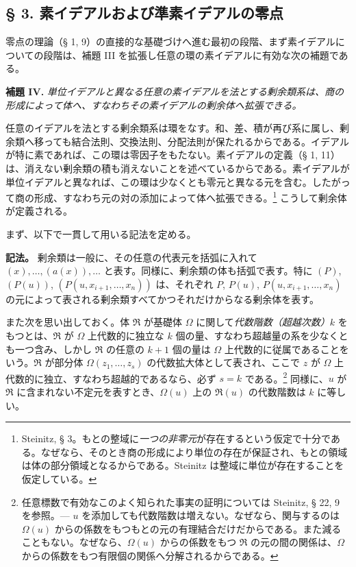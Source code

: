 \documentclass[11pt]{article}
\providecommand{\mR}{\mathfrak{R}}
\providecommand{\mR}{\mathfrak{R}}
\begin{document}
\subsection*{§ 3. 素イデアルおよび準素イデアルの零点}

零点の理論（§ 1, 9）の直接的な基礎づけへ進む最初の段階、まず素イデアルについての段階は、補題 III を拡張し任意の環の素イデアルに有効な次の補題である。

\textbf{補題 IV.} \emph{単位イデアルと異なる任意の素イデアルを法とする剰余類系は、商の形成によって体へ、すなわちその素イデアルの剰余体へ拡張できる。}

任意のイデアルを法とする剰余類系は環をなす。和、差、積が再び系に属し、剰余類へ移っても結合法則、交換法則、分配法則が保たれるからである。イデアルが特に素であれば、この環は零因子をもたない。素イデアルの定義（§ 1, 11）は、消えない剰余類の積も消えないことを述べているからである。素イデアルが単位イデアルと異なれば、この環は少なくとも零元と異なる元を含む。したがって商の形成、すなわち元の対の添加によって体へ拡張できる。\footnote{Steinitz, § 3。もとの整域に\emph{一つの非零元}が存在するという仮定で十分である。なぜなら、そのとき商の形成により単位の存在が保証され、もとの領域は体の部分領域となるからである。Steinitz は整域に単位が存在することを仮定している。} こうして剰余体が定義される。

まず、以下で一貫して用いる記法を定める。

\textbf{記法。} 剰余類は一般に、その任意の代表元を括弧に入れて $(x),\ldots,(a(x)),\ldots$ と表す。同様に、剰余類の体も括弧で表す。特に $(P)$, $(P(u))$, $(P(u,x_{i+1},\ldots,x_n))$ は、それぞれ $P$, $P(u)$, $P(u,x_{i+1},\ldots,x_n)$ の元によって表される剰余類すべてかつそれだけからなる剰余体を表す。

また次を思い出しておく。体 $\mR$ が基礎体 $\Omega$ に関して\emph{代数階数（超越次数）}$k$ をもつとは、$\mR$ が $\Omega$ 上代数的に独立な $k$ 個の量、すなわち超越量の系を少なくとも一つ含み、しかし $\mR$ の任意の $k+1$ 個の量は $\Omega$ 上代数的に従属であることをいう。$\mR$ が部分体 $\Omega(z_1,\ldots,z_s)$ の代数拡大体として表され、ここで $z$ が $\Omega$ 上代数的に独立、すなわち超越的であるなら、必ず $s=k$ である。\footnote{任意標数で有効なこのよく知られた事実の証明については Steinitz, § 22, 9 を参照。--- $u$ を添加しても代数階数は増えない。なぜなら、関与するのは $\Omega(u)$ からの係数をもつもとの元の有理結合だけだからである。また減ることもない。なぜなら、$\Omega(u)$ からの係数をもつ $\mR$ の元の間の関係は、$\Omega$ からの係数をもつ有限個の関係へ分解されるからである。} 同様に、$u$ が $\mR$ に含まれない不定元を表すとき、$\Omega(u)$ 上の $\mR(u)$ の代数階数は $k$ に等しい。
\end{document}

